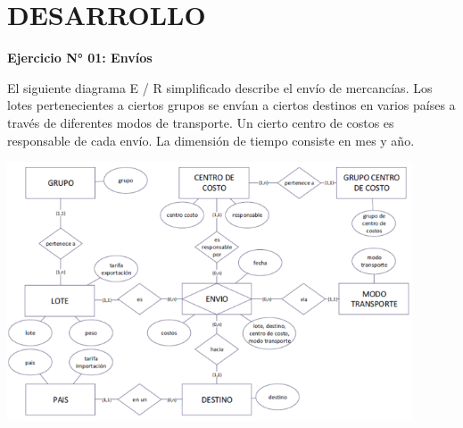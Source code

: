 \section{DESARROLLO}
\textbf{Ejercicio N° 01: Envíos} \\
\item{El siguiente diagrama E / R simplificado describe el envío de mercancías. Los lotes pertenecientes a ciertos grupos se envían a ciertos destinos en varios países a través de diferentes modos de transporte. Un cierto centro de costos es responsable de cada envío. La dimensión de tiempo consiste en mes y año.}
\begin{center}
\includegraphics[width=12cm]{./Imagenes/1}
\end{center}

